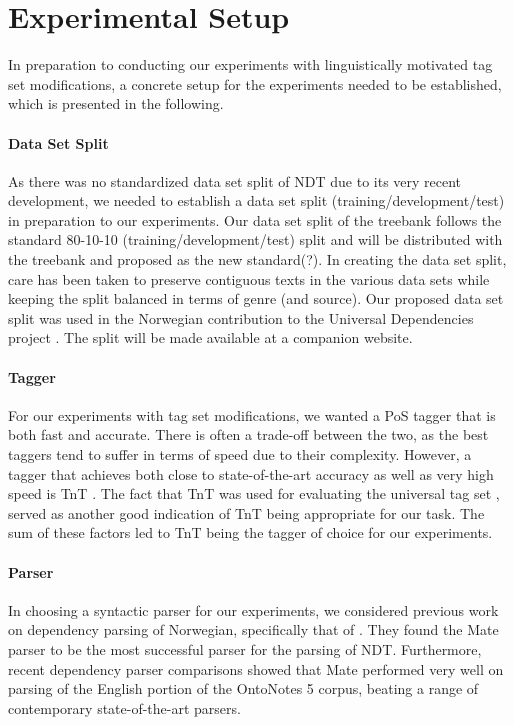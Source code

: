 \documentclass[11pt,a4paper]{article}
\begin{document}
\section{Experimental Setup}
\label{sec:setup}
In preparation to conducting our experiments with linguistically motivated tag
set modifications, a concrete setup for the experiments needed to be
established, which is presented in the following.

\paragraph{Data Set Split}
As there was no standardized data set split of NDT due to its very recent
development, we needed to establish a data set split
(training/development/test) in preparation to our experiments. Our data set
split of the treebank follows the standard 80-10-10 (training/development/test)
split and will be distributed with the treebank and proposed as the new
standard(?). In creating the data set split, care has been taken to preserve
contiguous texts in the various data sets while keeping the split balanced in
terms of genre (and source). Our proposed data set split was used in the
Norwegian contribution to the Universal Dependencies project \cite{Ovr:Hoh:16}.
The split will be made available at a companion website.

\paragraph{Tagger}
For our experiments with tag set modifications, we wanted a PoS tagger that is
both fast and accurate. There is often a trade-off between the two, as the best
taggers tend to suffer in terms of speed due to their complexity. However, a
tagger that achieves both close to state-of-the-art accuracy as well as very
high speed is TnT \cite{Bra:00}. The fact that TnT was used for evaluating the
universal tag set \cite{Pet:Das:McD:12}, served as another good indication of
TnT being appropriate for our task. The sum of these factors led to TnT being
the tagger of choice for our experiments.

\paragraph{Parser}
In choosing a syntactic parser for our experiments, we considered previous work
on dependency parsing of Norwegian, specifically that of \cite{Sol:Skj:Ovr:14}.
They found the Mate parser \cite{Boh:10} to be the most successful parser for
the parsing of NDT. Furthermore, recent dependency parser comparisons
\cite{Cho:Tet:Ste:15} showed that Mate performed very well on parsing of the
English portion of the OntoNotes 5 corpus, beating a range of contemporary
state-of-the-art parsers.
\end{document}
